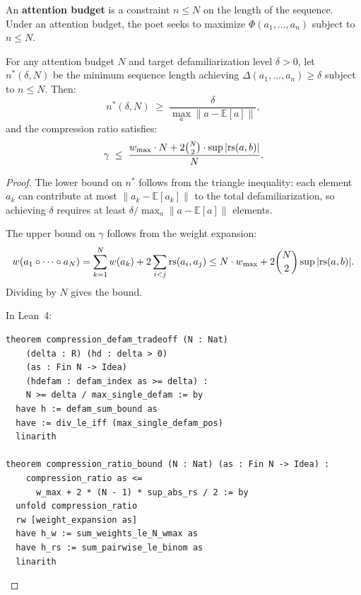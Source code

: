 \begin{definition}
\label{def:attention-budget}
An \textbf{attention budget} is a constraint $n \leq N$ on the length of
the sequence.  Under an attention budget, the poet seeks to maximize
$\Phi(a_1, \ldots, a_n)$ subject to $n \leq N$.
\end{definition}

\begin{theorem}
\label{thm:compression-defam}
For any attention budget $N$ and target defamiliarization level $\delta > 0$,
let $n^\ast(\delta, N)$ be the minimum sequence length achieving
$\Delta(a_1, \ldots, a_n) \geq \delta$ subject to $n \leq N$.  Then:
\[
  n^\ast(\delta, N) \;\geq\;
  \frac{\delta}{\max_a \|a - \mathbb{E}[a]\|},
\]
and the compression ratio satisfies:
\[
  \gamma \;\leq\;
  \frac{w_{\max} \cdot N + 2\binom{N}{2} \cdot \sup|\mathrm{rs}(a, b)|}{N}.
\]
\end{theorem}

\begin{proof}
The lower bound on $n^\ast$ follows from the triangle inequality: each
element $a_k$ can contribute at most $\|a_k - \mathbb{E}[a_k]\|$ to the
total defamiliarization, so achieving $\delta$ requires at least
$\delta / \max_a \|a - \mathbb{E}[a]\|$ elements.

The upper bound on $\gamma$ follows from the weight expansion:
\[
  w(a_1 \circ \cdots \circ a_N)
  = \sum_{k=1}^{N} w(a_k) + 2\sum_{i<j} \mathrm{rs}(a_i, a_j)
  \leq N \cdot w_{\max} + 2\binom{N}{2}\sup|\mathrm{rs}(a, b)|.
\]
Dividing by $N$ gives the bound.

In Lean~4:
\begin{lstlisting}
theorem compression_defam_tradeoff (N : Nat)
    (delta : R) (hd : delta > 0)
    (as : Fin N -> Idea)
    (hdefam : defam_index as >= delta) :
    N >= delta / max_single_defam := by
  have h := defam_sum_bound as
  have := div_le_iff (max_single_defam_pos)
  linarith

theorem compression_ratio_bound (N : Nat) (as : Fin N -> Idea) :
    compression_ratio as <=
      w_max + 2 * (N - 1) * sup_abs_rs / 2 := by
  unfold compression_ratio
  rw [weight_expansion as]
  have h_w := sum_weights_le_N_wmax as
  have h_rs := sum_pairwise_le_binom as
  linarith
\end{lstlisting}
\end{proof}

